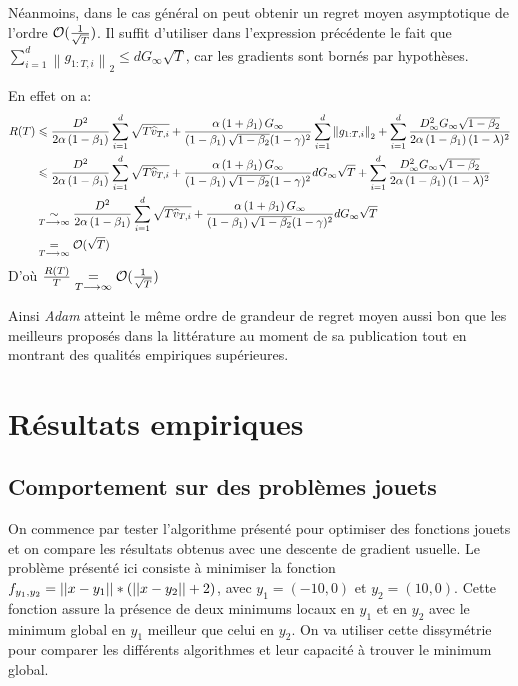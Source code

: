\documentclass[fleqn,11pt, titlepage, french]{article}
\begin{document}
	Néanmoins, dans le cas général on peut obtenir un regret moyen asymptotique de l'ordre $\mathcal O(\frac{1}{\sqrt{T}})$. Il suffit d'utiliser dans l'expression précédente le fait que $\sum_{i=1}^{d}\left\|g_{1: T, i}\right\|_{2} \leq d G_\infty \sqrt{T}$, car les gradients sont bornés par hypothèses.
	
	En effet on a:
	\begin{align*}
		R(T) & \leqslant \frac{D^{2}}{2 \alpha\left(1-\beta_{1}\right)} \sum_{i=1}^{d} \sqrt{T \widehat{v}_{T, i}}+\frac{\alpha\left(1+\beta_{1}\right) G_{\infty}}{\left(1-\beta_{1}\right) \sqrt{1-\beta_{2}}(1-\gamma)^{2}} \sum_{i=1}^{d}\left\|g_{1: T, i}\right\|_{2}+\sum_{i=1}^{d} \frac{D_{\infty}^{2} G_{\infty} \sqrt{1-\beta_{2}}}{2 \alpha\left(1-\beta_{1}\right)(1-\lambda)^{2}} \\
		&\leqslant \frac{D^{2}}{2 \alpha\left(1-\beta_{1}\right)} \sum_{i=1}^{d} \sqrt{T \widehat{v}_{T, i}}+\frac{\alpha\left(1+\beta_{1}\right) G_{\infty}}{\left(1-\beta_{1}\right) \sqrt{1-\beta_{2}}(1-\gamma)^{2}} d G_\infty \sqrt{T} +\sum_{i=1}^{d} \frac{D_{\infty}^{2} G_{\infty} \sqrt{1-\beta_{2}}}{2 \alpha\left(1-\beta_{1}\right)(1-\lambda)^{2}} \\
		&\underset{T \longrightarrow \infty}{\sim} \frac{D^{2}}{2 \alpha\left(1-\beta_{1}\right)} \sum_{i=1}^{d} \sqrt{T \widehat{v}_{T, i}}+\frac{\alpha\left(1+\beta_{1}\right) G_{\infty}}{\left(1-\beta_{1}\right) \sqrt{1-\beta_{2}}(1-\gamma)^{2}} d G_\infty \sqrt{T} \\
		&\underset{T \longrightarrow \infty}{=} \mathcal O(\sqrt{T})
	\end{align*}
	D'où $\frac{R(T)}{T} \underset{T \longrightarrow \infty}{=} \mathcal O(\frac{1}{\sqrt{T}})$

	Ainsi \emph{Adam} atteint le même ordre de grandeur de regret moyen aussi bon que les meilleurs proposés dans la littérature au moment de sa publication\cite{adam} tout en montrant des qualités empiriques supérieures.
	 
	\section{Résultats empiriques}
	
	\subsection{Comportement sur des problèmes jouets}
	
	On commence par tester l'algorithme présenté pour optimiser des fonctions jouets et on compare les résultats obtenus avec une descente de gradient usuelle. Le problème présenté ici consiste à minimiser la fonction $f_{y_1, y_2} = \left|\left|x-y_1\right|\right| * (\left|\left|x-y_2\right|\right| +2) $, avec $y_1 = (-10, 0)$ et $y_2 = (10, 0)$. Cette fonction assure la présence de deux minimums locaux en $y_1$ et en $y_2$ avec le minimum global en $y_1$ meilleur que celui en $y_2$. On va utiliser cette dissymétrie pour comparer les différents algorithmes et leur capacité à trouver le minimum global.
	
\end{document}

